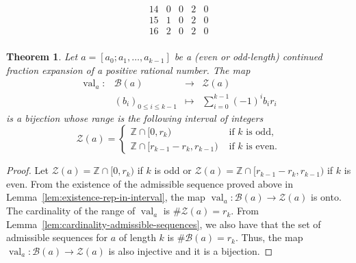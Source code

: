 \documentclass[a4paper,12pt]{amsart}
\newtheorem{theorem}[definition]{Theorem}
\newcommand{\Z}{\mathbb{Z}}
\newcommand{\Bcal}{{\mathcal{B}}}
\newcommand{\Zcal}{{\mathcal{Z}}}
\newcommand{\0}{\mathtt{0}}
\newcommand{\1}{\mathtt{1}}
\newcommand{\2}{\mathtt{2}}
\newcommand{\3}{\mathtt{3}}
\DeclareMathOperator{\val}{val}
\begin{document}
\begin{table}
\[\begin{array}{c|cccc}
  14   &  0  &  0    & 2   & 0 \\
  15   &  1  &  0    & 2   & 0 \\
  16   &  2  &  0    & 2   & 0 \\
\end{array}
\]
\caption{
    Let $a=[2;2,2]$ be the continued fraction expansion of $12/5$.  The table
    on the left shows the admissible representation $(b_0,b_1,b_2)$ of every
    integer $n$ in the interval $0 \leq n < r_3=17$.
    They satisfy $n=b_0r_0-b_1r_1+b_2r_2$.
    Let $a=[2;2,2,2]$ be the continued fraction expansion of $29/12$.
    The table on the right shows the admissible representation $(b_0,b_1,b_2,b_3)$ of every integer
    $n$ in the interval $-24=r_3-r_4 \leq n < r_3=17$.
    They satisfy $n=b_0r_0-b_1r_1+b_2r_2-b_3r_3$.
    }
\label{table:2222}
\end{table}

%
%
%
%
%
%
%
%
%
%
%
%
%
%
%
%
%
%
%
%
%
%
%
%
%
%
%
%
%
%
%
%
%
%
%
%
%
%
%
%
%
%
%
%
%
%
%
%
%
%
%
%
%
%
%
%
%
%
%
%
%
%
%
%
%
%
%
%
%
%
%
%
%
%




\begin{theorem}\label{thm:bijection-admissible-to-interval-integers}
    Let $a=[a_0; a_1, \dots, a_{k-1}]$ be a (even or odd-length) continued
    fraction expansion of a positive rational number.
    The map
    \[
    \begin{array}{rccl}
        \val_a:&\Bcal(a)&\to& \Zcal(a) \\
        &(b_i)_{0\leq i\leq k-1}&\mapsto &\sum_{i=0}^{k-1} (-1)^{i}b_{i}r_{i}
    \end{array}
    \]
    is a bijection whose range is the following interval of integers
    \[
        \Zcal(a) =
        \begin{cases}
            \Z\cap [0,r_{k})               & \text{ if $k$ is odd,}\\
            \Z\cap [r_{k-1}-r_{k},r_{k-1}) & \text{ if $k$ is even.}
        \end{cases}
    \]
\end{theorem}


\begin{proof}
    Let $\Zcal(a)=\Z\cap[0,r_{k})$ if $k$ is odd or
    $\Zcal(a)=\Z\cap[r_{k-1}-r_{k},r_{k-1})$ if $k$ is even.
    From the existence of the admissible sequence proved above
    in Lemma~\ref{lem:existence-rep-in-interval},
    the map $\val_a:\Bcal(a)\to \Zcal(a)$ is onto.
    The cardinality of the range of $\val_a$ is $\#\Zcal(a)=r_{k}$.
    From Lemma~\ref{lem:cardinality-admissible-sequences},
    we also have that the set of admissible sequences for $a$ of length $k$ is
    $\#\Bcal(a)  = r_{k}$.
    Thus, the map $\val_a:\Bcal(a)\to \Zcal(a)$ is also injective
    and it is a bijection.
\end{proof}
\end{document}
